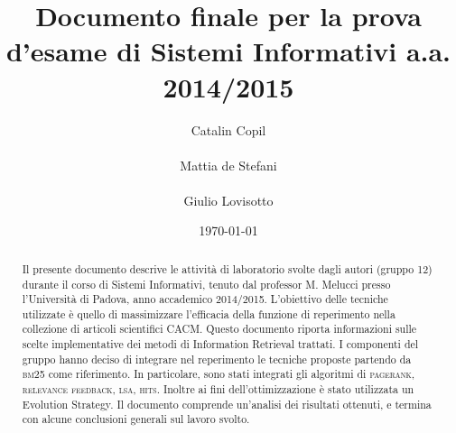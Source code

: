 \documentclass{llncs}
\begin{document}
\title{Documento finale per la prova d'esame di Sistemi Informativi
  a.a. 2014/2015} 
\author{
	Catalin Copil\\\\ 
	Mattia de Stefani\\\\ 
	Giulio Lovisotto\\} 
\institute{}

\date{\today}

\maketitle
\begin{abstract}
Il presente documento descrive le attivit\`a di laboratorio svolte dagli autori (gruppo 12) durante il corso di Sistemi Informativi, tenuto dal professor M. Melucci presso l'Universit\`a di Padova, anno accademico 2014/2015. 
L'obiettivo delle tecniche utilizzate \`e quello di massimizzare l'efficacia della funzione di reperimento nella collezione di articoli scientifici CACM. Questo documento riporta informazioni sulle scelte implementative dei metodi di Information Retrieval trattati. I componenti del gruppo hanno deciso di integrare nel reperimento le tecniche proposte partendo da \textsc{bm25} come riferimento. In particolare, sono stati integrati gli algoritmi di \textsc{pagerank}, \textsc{relevance feedback}, \textsc{lsa}, \textsc{hits}. Inoltre ai fini dell'ottimizzazione \`e stato utilizzata un Evolution Strategy. Il documento comprende un'analisi dei risultati ottenuti, e termina con alcune conclusioni generali sul lavoro svolto.

	
	
\end{abstract}
\end{document}
